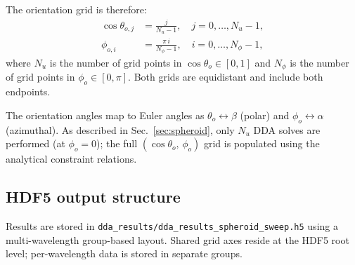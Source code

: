 \documentclass[11pt,a4paper]{article}
\begin{document}
The orientation grid is therefore:
\begin{align}
  \cos\theta_{o,j} &= \frac{j}{N_u - 1},
                     \quad j = 0,\dots,N_u-1,
  \label{eq:sweep-costheta} \\
  \phi_{o,i} &= \frac{\pi\,i}{N_\phi - 1},
               \quad i = 0,\dots,N_\phi-1,
  \label{eq:sweep-phi}
\end{align}
where $N_u$ is the number of grid points in $\cos\theta_o \in [0, 1]$
and $N_\phi$ is the number of grid points in $\phi_o \in [0, \pi]$.
Both grids are equidistant and include both endpoints.

The orientation angles map to Euler angles as
$\theta_o \leftrightarrow \beta$ (polar) and
$\phi_o \leftrightarrow \alpha$ (azimuthal).
As described in Sec.~\ref{sec:spheroid}, only $N_u$ DDA solves are
performed (at $\phi_o = 0$); the full $(\cos\theta_o,\, \phi_o)$
grid is populated using the analytical constraint relations.

\subsection{HDF5 output structure}
\label{sec:sweep-hdf5}

Results are stored in \texttt{dda\_results/dda\_results\_spheroid\_sweep.h5}
using a multi-wavelength group-based layout.  Shared grid axes reside at
the HDF5 root level; per-wavelength data is stored in separate groups.
\end{document}
